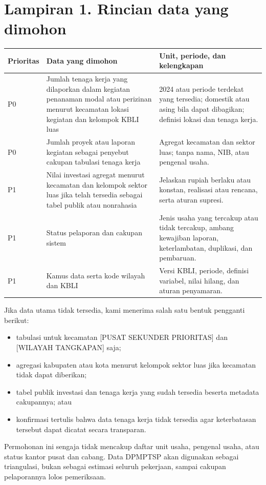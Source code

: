 \documentclass[12pt]{article}
\newcommand{\PusatSekunder}{[PUSAT SEKUNDER PRIORITAS]}
\newcommand{\WilayahTangkapan}{[WILAYAH TANGKAPAN]}
\newcommand{\PeriodeData}{2024 atau periode terdekat yang tersedia}
\begin{document}
\TandaTanganDTAP

\clearpage
\section*{Lampiran 1. Rincian data yang dimohon}

\renewcommand{\arraystretch}{1.25}
\begin{tabularx}{\textwidth}{@{}P{0.12\textwidth}P{0.34\textwidth}Y@{}}
\toprule
Prioritas & Data yang dimohon & Unit, periode, dan kelengkapan \\
\midrule
P0 & Jumlah tenaga kerja yang dilaporkan dalam kegiatan penanaman modal atau perizinan menurut kecamatan lokasi kegiatan dan kelompok KBLI luas & \PeriodeData; domestik atau asing bila dapat dibagikan; definisi lokasi dan tenaga kerja. \\
P0 & Jumlah proyek atau laporan kegiatan sebagai penyebut cakupan tabulasi tenaga kerja & Agregat kecamatan dan sektor luas; tanpa nama, NIB, atau pengenal usaha. \\
P1 & Nilai investasi agregat menurut kecamatan dan kelompok sektor luas jika telah tersedia sebagai tabel publik atau nonrahasia & Jelaskan rupiah berlaku atau konstan, realisasi atau rencana, serta aturan supresi. \\
P1 & Status pelaporan dan cakupan sistem & Jenis usaha yang tercakup atau tidak tercakup, ambang kewajiban laporan, keterlambatan, duplikasi, dan pembaruan. \\
P1 & Kamus data serta kode wilayah dan KBLI & Versi KBLI, periode, definisi variabel, nilai hilang, dan aturan penyamaran. \\
\bottomrule
\end{tabularx}

\vspace{8pt}
Jika data utama tidak tersedia, kami menerima salah satu bentuk pengganti berikut:
\begin{itemize}
  \item tabulasi untuk kecamatan \PusatSekunder{} dan \WilayahTangkapan{} saja;
  \item agregasi kabupaten atau kota menurut kelompok sektor luas jika kecamatan tidak dapat diberikan;
  \item tabel publik investasi dan tenaga kerja yang sudah tersedia beserta metadata cakupannya; atau
  \item konfirmasi tertulis bahwa data tenaga kerja tidak tersedia agar keterbatasan tersebut dapat dicatat secara transparan.
\end{itemize}

Permohonan ini sengaja tidak mencakup daftar unit usaha, pengenal usaha, atau status kantor pusat dan cabang. Data DPMPTSP akan digunakan sebagai triangulasi, bukan sebagai estimasi seluruh pekerjaan, sampai cakupan pelaporannya lolos pemeriksaan.

\LampiranAbstraksi
\end{document}
